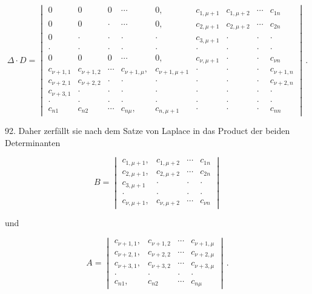\[
\Delta\cdot D =
\begin{vmatrix}
0 & 0 & 0 & \cdots & 0, & c_{1,\mu+1} & c_{1,\mu+2} & \cdots & c_{1n} \\
0 & 0 & \cdot & \cdots & 0, & c_{2,\mu+1} & c_{2,\mu+2} & \cdots & c_{2n} \\
0 & \cdot & \cdot & \cdot & \cdot & c_{3,\mu+1} & \cdot & \cdot & \cdot \\
\cdot & \cdot & \cdot & \cdot & \cdot & \cdot & \cdot & \cdot & \cdot \\
0 & 0 & 0 & \cdots & 0, & c_{\nu,\mu+1} & \cdot & \cdot & c_{\nu n} \\
c_{\nu+1,1} & c_{\nu+1,2} & \cdots & c_{\nu+1,\mu}, & c_{\nu+1,\mu+1} & \cdot & \cdot & \cdot & c_{\nu+1,n} \\
c_{\nu+2,1} & c_{\nu+2,2} & \cdot & \cdot & \cdot & \cdot & \cdot & \cdot & c_{\nu+2,n} \\
c_{\nu+3,1} & \cdot & \cdot & \cdot & \cdot & \cdot & \cdot & \cdot & \cdot \\
\cdot & \cdot & \cdot & \cdot & \cdot & \cdot & \cdot & \cdot & \cdot \\
c_{n1} & c_{n2} & \cdots & c_{n\mu}, & c_{n,\mu+1} & \cdot & \cdot & \cdot & c_{nn}
\end{vmatrix}\, .
\]

92. Daher zerfällt sie nach dem Satze von Laplace in das Product der beiden Determinanten

\[
B =
\begin{vmatrix}
c_{1,\mu+1}, & c_{1,\mu+2} & \cdots & c_{1n} \\
c_{2,\mu+1}, & c_{2,\mu+2} & \cdots & c_{2n} \\
c_{3,\mu+1} & \cdot & \cdot & \cdot \\
\cdot & \cdot & \cdot & \cdot \\
c_{\nu,\mu+1}, & c_{\nu,\mu+2} & \cdots & c_{\nu n}
\end{vmatrix}
\]

und

\[
A =
\begin{vmatrix}
c_{\nu+1,1}, & c_{\nu+1,2} & \cdots & c_{\nu+1,\mu} \\
c_{\nu+2,1}, & c_{\nu+2,2} & \cdots & c_{\nu+2,\mu} \\
c_{\nu+3,1}, & c_{\nu+3,2} & \cdots & c_{\nu+3,\mu} \\
\cdot & \cdot & \cdot & \cdot \\
c_{n1}, & c_{n2} & \cdots & c_{n\mu}
\end{vmatrix}\, .
\]

